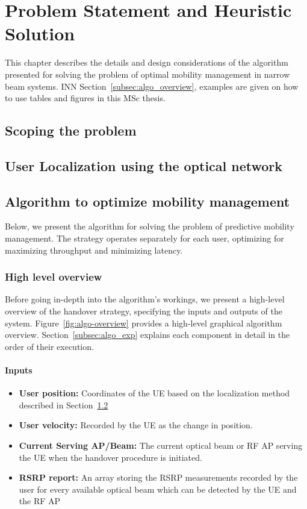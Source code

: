 \chapter{Problem Statement and Heuristic Solution}
\label{chp:problem_statement}

This chapter describes the details and design considerations of the algorithm presented for solving the problem of optimal mobility management in narrow beam systems. INN Section~\ref{subsec:algo_overview}, examples are given on how to use tables and figures in this MSc thesis.

\section{Scoping the problem}
\label{sec:scope}
\section{User Localization using the optical network}
\label{sec:loc_calc}
\section{Algorithm to optimize mobility management}
\label{sec:algorithm}
Below, we present the algorithm for solving the problem of predictive mobility management. The strategy operates separately for each user, optimizing for maximizing throughput and minimizing latency.
\subsection{High level overview}
Before going in-depth into the algorithm's workings, we present a high-level overview of the handover strategy, specifying the inputs and outputs of the system. Figure~\ref{fig:algo-overview} provides a high-level graphical algorithm overview. Section~\ref{subsec:algo_exp} explains each component in detail in the order of their execution.
\subsubsection{Inputs}
\begin{itemize}
    \item \textbf{User position:} Coordinates of the UE based on the localization method described in Section~\ref{sec:loc_calc}
    \item \textbf{User velocity:} Recorded by the UE as the change in position. 
    \item \textbf{Current Serving AP/Beam:} The current optical beam or RF AP serving the UE when the handover procedure is initiated.
    \item \textbf{RSRP report:} An array storing the RSRP measurements recorded by the user for every available optical beam which can be detected by the UE and the RF AP
\end{itemize}
